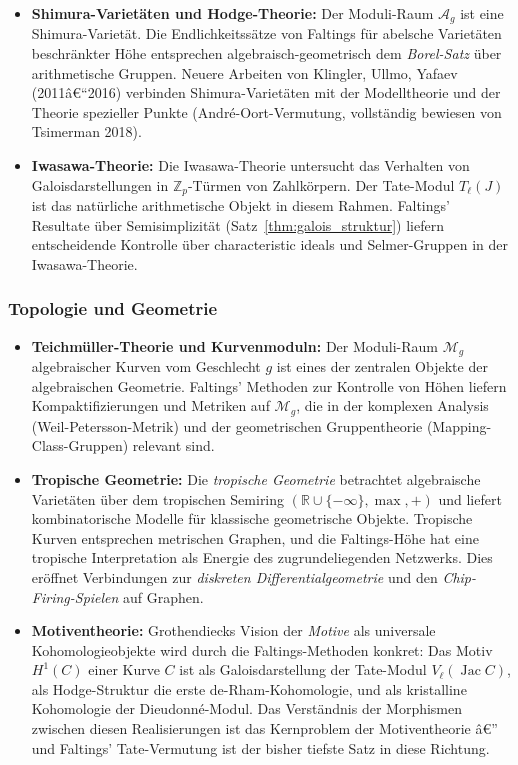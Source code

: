 ﻿\documentclass[12pt,a4paper]{article}
\theoremstyle{plain}
\theoremstyle{definition}
\theoremstyle{remark}
\newcommand{\Z}{\mathbb{Z}}
\newcommand{\R}{\mathbb{R}}
\DeclareMathOperator{\Jac}{Jac}
\begin{document}
\begin{itemize}[leftmargin=2em,itemsep=4pt]
  \item \textbf{Shimura-Varietäten und Hodge-Theorie:}
    Der Moduli-Raum $\mathcal A_g$ ist eine Shimura-Varietät. Die Endlichkeitssätze
    von Faltings für abelsche Varietäten beschränkter Höhe entsprechen
    algebraisch-geometrisch dem \emph{Borel-Satz} über arithmetische Gruppen.
    Neuere Arbeiten von Klingler, Ullmo, Yafaev (2011â€“2016) verbinden Shimura-Varietäten
    mit der Modelltheorie und der Theorie spezieller Punkte (André-Oort-Vermutung,
    vollständig bewiesen von Tsimerman 2018).

  \item \textbf{Iwasawa-Theorie:}
    Die Iwasawa-Theorie untersucht das Verhalten von Galoisdarstellungen in
    $\Z_p$-Türmen von Zahlkörpern. Der Tate-Modul $T_\ell(J)$ ist das natürliche
    arithmetische Objekt in diesem Rahmen. Faltings' Resultate über Semisimplizität
    (Satz~\ref{thm:galois_struktur}) liefern entscheidende Kontrolle über
    characteristic ideals und Selmer-Gruppen in der Iwasawa-Theorie.
\end{itemize}

\subsubsection{Topologie und Geometrie}

\begin{itemize}[leftmargin=2em,itemsep=4pt]
  \item \textbf{Teichmüller-Theorie und Kurvenmoduln:}
    Der Moduli-Raum $\mathcal M_g$ algebraischer Kurven vom Geschlecht $g$ ist eines
    der zentralen Objekte der algebraischen Geometrie. Faltings' Methoden zur Kontrolle
    von Höhen liefern Kompaktifizierungen und Metriken auf $\mathcal M_g$,
    die in der komplexen Analysis (Weil-Petersson-Metrik) und der
    geometrischen Gruppentheorie (Mapping-Class-Gruppen) relevant sind.

  \item \textbf{Tropische Geometrie:}
    Die \emph{tropische Geometrie} betrachtet algebraische Varietäten über dem
    tropischen Semiring $(\R \cup \{-\infty\}, \max, +)$ und liefert kombinatorische
    Modelle für klassische geometrische Objekte. Tropische Kurven entsprechen
    metrischen Graphen, und die Faltings-Höhe hat eine tropische Interpretation als
    Energie des zugrundeliegenden Netzwerks. Dies eröffnet Verbindungen zur
    \emph{diskreten Differentialgeometrie} und den \emph{Chip-Firing-Spielen} auf Graphen.

  \item \textbf{Motiventheorie:}
    Grothendiecks Vision der \emph{Motive} als universale Kohomologieobjekte wird durch
    die Faltings-Methoden konkret: Das Motiv $H^1(C)$ einer Kurve $C$ ist als
    Galoisdarstellung der Tate-Modul $V_\ell(\Jac C)$, als Hodge-Struktur die
    erste de-Rham-Kohomologie, und als kristalline Kohomologie der Dieudonné-Modul.
    Das Verständnis der Morphismen zwischen diesen Realisierungen ist das Kernproblem
    der Motiventheorie â€” und Faltings' Tate-Vermutung ist der bisher tiefste Satz
    in diese Richtung.
\end{itemize}
\end{document}
